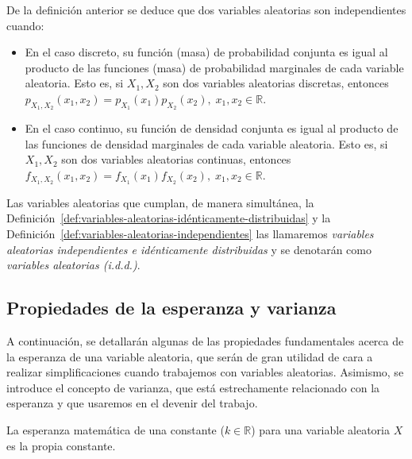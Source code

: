 \begin{observacion}
    De la definición anterior se deduce que dos variables aleatorias son independientes cuando:
    \begin{itemize}
        \item En el caso discreto, su función (masa) de probabilidad conjunta es igual al producto de las funciones (masa) de probabilidad marginales de cada variable aleatoria. Esto es, si $X_1, X_2$ son dos variables aleatorias discretas, entonces $p_{X_1, X_2}(x_1, x_2) = p_{X_1}(x_1)p_{X_2}(x_2), \; x_1, x_2 \in \mathbb{R}$.
        \item En el caso continuo, su función de densidad conjunta es igual al producto de las funciones de densidad marginales de cada variable aleatoria. Esto es, si $X_1, X_2$ son dos variables aleatorias continuas, entonces $f_{X_1, X_2}(x_1, x_2) = f_{X_1}(x_1)f_{X_2}(x_2), \; x_1, x_2 \in \mathbb{R}$.\newline
    \end{itemize}
\end{observacion}

\begin{definicion}
    Las variables aleatorias que cumplan, de manera simultánea, la Definición~\ref{def:variables-aleatorias-idénticamente-distribuidas} y la Definición~\ref{def:variables-aleatorias-independientes} las llamaremos \emph{variables aleatorias independientes e idénticamente distribuidas} y se denotarán como \emph{variables aleatorias (i.d.d.)}.\newline
\end{definicion}

\subsection{Propiedades de la esperanza y varianza}
A continuación, se detallarán algunas de las propiedades fundamentales acerca de la esperanza de una variable aleatoria, que serán de gran utilidad de cara a realizar simplificaciones cuando trabajemos con variables aleatorias. Asimismo, se introduce el concepto de varianza, que está estrechamente relacionado con la esperanza y que usaremos en el devenir del trabajo.\newline

\begin{proposicion}
    La esperanza matemática de una constante ($k \in \mathbb{R}$) para una variable aleatoria $X$ es la propia constante.\newline
\end{proposicion}

